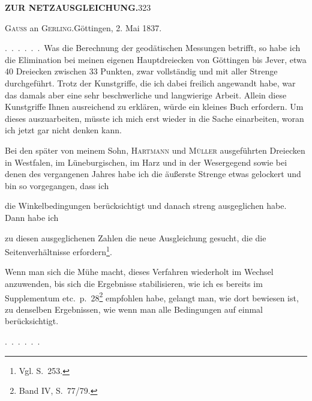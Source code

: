 \noindent\textbf{ZUR NETZAUSGLEICHUNG.}\hfill323
\begin{center}\textsc{Gauss} an \textsc{Gerling}.\quad Göttingen, 2. Mai 1837.\end{center}

.\ .\ .\ .\ .\ .\ Was die Berechnung der geodätischen Messungen betrifft, so
habe ich die Elimination bei meinen eigenen Hauptdreiecken von Göttingen
bis Jever, etwa 40 Dreiecken zwischen 33 Punkten, zwar vollständig und
mit aller Strenge durchgeführt. Trotz der Kunstgriffe, die ich dabei
freilich angewandt habe, war das damals aber eine sehr beschwerliche und
langwierige Arbeit. Allein diese Kunstgriffe Ihnen ausreichend zu erklären,
würde ein kleines Buch erfordern. Um dieses auszuarbeiten, müsste ich mich
erst wieder in die Sache einarbeiten, woran ich jetzt gar nicht denken kann.

\begingroup
\def\letterfourstars{*}
\makeatletter
\renewcommand{\@makefnmark}{\hbox{\normalfont[\textsuperscript{\letterfourstars})]}}
\renewcommand{\@makefntext}[1]{\parindent1em\noindent\hbox to2em{\hss[\textsuperscript{\letterfourstars})\ }#1]}
\makeatother
Bei den später von meinem Sohn, \textsc{Hartmann} und \textsc{Müller} ausgeführten
Dreiecken in Westfalen, im Lüneburgischen, im Harz und in der Wesergegend
sowie bei denen des vergangenen Jahres habe ich die äußerste Strenge
etwas gelockert und bin so vorgegangen, dass ich
\begin{list}{}{\setlength{\leftmargin}{2.4em}\setlength{\labelwidth}{1.5em}\setlength{\labelsep}{.5em}\setlength{\itemsep}{.3em}\setlength{\topsep}{.3em}}
\item[1)] die Winkelbedingungen  berücksichtigt und danach streng ausgeglichen habe. Dann habe ich
\item[2)] zu diesen ausgeglichenen Zahlen die neue Ausgleichung gesucht, die
die Seitenverhältnisse erfordern\footnote{Vgl. S.\ 253.}.
\end{list}
\def\letterfourstars{**}
\par\noindent\hspace*{\parindent}Wenn man sich die Mühe macht, dieses Verfahren wiederholt im Wechsel
anzuwenden, bis sich die Ergebnisse stabilisieren, wie ich es bereits im
Supplementum etc.\ p.\ 28\footnote{Band IV, S.\ 77/79.} empfohlen habe, gelangt man,
wie dort bewiesen ist, zu  denselben Ergebnissen, wie wenn man
alle Bedingungen auf einmal berücksichtigt.
\par\medskip
.\ .\ .\ .\ .\ .
\endgroup
